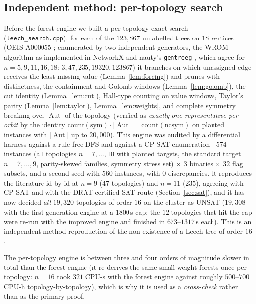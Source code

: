 \documentclass[11pt,a4paper]{article}
\theoremstyle{plain}
\theoremstyle{remark}
\newcommand{\Aut}{\operatorname{Aut}}
\newcommand{\file}[1]{\texttt{#1}}
\begin{document}
\subsection{Independent method: per-topology search}\label{sec:pertopology}

Before the forest engine we built a per-topology exact search
(\file{leech\_search.cpp}): for each of the $123{,}867$ unlabelled trees on $18$
vertices (OEIS A000055 \cite{OEIS}; enumerated by two independent generators,
the WROM algorithm \cite{WROM1986} as implemented in NetworkX
\cite{HagbergNetworkX2008} and nauty's \texttt{gentreeg} \cite{McKayPiperno2014},
which agree for $n=5,9,11,16,18$: $3,47,235,19320,123867$) it branches on which
unassigned edge receives the least missing value (Lemma~\ref{lem:forcing}) and
prunes with distinctness, the containment and Golomb windows
(Lemma~\ref{lem:golomb}), the cut identity (Lemma~\ref{lem:cut}), Hall-type
counting on value windows, Taylor's parity (Lemma~\ref{lem:taylor}),
Lemma~\ref{lem:weights}, and complete symmetry breaking over $\Aut$ of the
topology (verified as \emph{exactly one representative per orbit} by the
identity $\mathrm{count(sym)}\cdot|\Aut|=\mathrm{count(nosym)}$ on planted
instances with $|\Aut|$ up to $20{,}000$).  This engine was audited by a
differential harness against a rule-free DFS and against a CP-SAT enumeration
\cite{ORTools}: $574$ instances (all topologies $n=7,\dots,10$ with planted
targets, the standard target $n=7,\dots,9$, parity-skewed families, symmetry
stress set) $\times$ $3$ binaries $\times$ $32$ flag subsets, and a second seed
with $560$ instances, with $0$ discrepancies.  It reproduces the literature
id-by-id at $n=9$ ($47$ topologies) and $n=11$ ($235$), agreeing with CP-SAT and
with the DRAT-certified SAT route (Section~\ref{sec:sat}), and it has now decided
\emph{all} $19{,}320$ topologies of order $16$ on the cluster as UNSAT
($19{,}308$ with the first-generation engine at a $1800$\,s cap; the $12$
topologies that hit the cap were re-run with the improved engine and finished in
$673$--$1317$\,s each).  This is an independent-method reproduction of the
non-existence of a Leech tree of order $16$ \cite{Calhoun2007}.

The per-topology engine is between three and four orders of magnitude slower in
total than the forest engine (it re-derives the same small-weight forests once
per topology: $n=16$ took $321$ CPU-s with the forest engine against roughly
$500$--$700$ CPU-h topology-by-topology), which is why it is used as a
\emph{cross-check} rather than as the primary proof.
\end{document}
